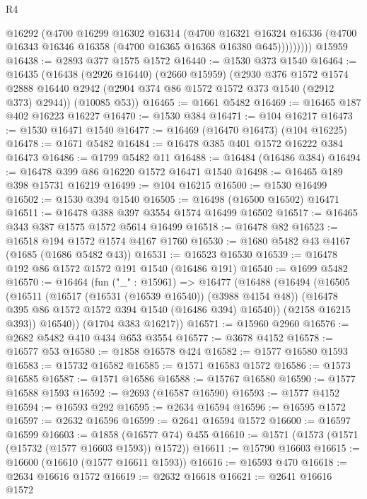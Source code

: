 \begin{lexlean}{R4}
\begin{coremodule}
              @16292
              (@4700
                @16299
                @16302
                @16314
                (@4700
                  @16321
                  @16324
                  @16336
                  (@4700 @16343 @16346 @16358 (@4700 @16365 @16368 @16380 @645)))))))))
    @15959
@16438 := @2893 @377 @1575 @1572
@16440 := @1530 @373 @1540
@16464 := @16435
    (@16438
      (@2926 @16440)
      (@2660 @15959)
      (@2930
        @376
        @1572
        @1574
        @2888
        @16440
        @2942
        (@2904 @374 @86 @1572 @1572 @373 @1540 (@2912 @373) @2944))
      (@10085 @53))
@16465 := @1661 @5482
@16469 := @16465 @187 @402 @16223 @16227
@16470 := @1530 @384
@16471 := @104 @16217
@16473 := @1530 @16471 @1540
@16477 := @16469 (@16470 @16473) (@104 @16225)
@16478 := @1671 @5482
@16484 := @16478 @385 @401 @1572 @16222 @384 @16473
@16486 := @1799 @5482 @11
@16488 := @16484 (@16486 @384)
@16494 := @16478 @399 @86 @16220 @1572 @16471 @1540
@16498 := @16465 @189 @398 @15731 @16219
@16499 := @104 @16215
@16500 := @1530 @16499
@16502 := @1530 @394 @1540
@16505 := @16498 (@16500 @16502) @16471
@16511 := @16478 @388 @397 @3554 @1574 @16499 @16502
@16517 := @16465 @343 @387 @1575 @1572 @5614 @16499
@16518 := @16478 @82
@16523 := @16518 @194 @1572 @1574 @4167 @1760
@16530 := @1680 @5482 @43 @4167 (@1685 (@1686 @5482 @43))
@16531 := @16523 @16530
@16539 := @16478 @192 @86 @1572 @1572 @191 @1540 (@16486 @191)
@16540 := @1699 @5482
@16570 := @16464
    (fun ("_" : @15961) =>
    @16477
      (@16488
        (@16494
          (@16505
            (@16511
              (@16517 (@16531 (@16539 @16540)) (@3988 @4154 @48))
              (@16478 @395 @86 @1572 @1572 @394 @1540 (@16486 @394) @16540))
            (@2158 @16215 @393))
          @16540))
      (@1704 @383 @16217))
@16571 := @15960 @2960
@16576 := @2682 @5482 @410 @434 @653 @3554
@16577 := @3678 @4152
@16578 := @16577 @53
@16580 := @1858 @16578 @424
@16582 := @1577 @16580 @1593
@16583 := @15732 @16582
@16585 := @1571 @16583 @1572
@16586 := @1573 @16585
@16587 := @1571 @16586
@16588 := @15767 @16580
@16590 := @1577 @16588 @1593
@16592 := @2693 (@16587 @16590)
@16593 := @1577 @4152
@16594 := @16593 @292
@16595 := @2634 @16594
@16596 := @16595 @1572
@16597 := @2632 @16596
@16599 := @2641 @16594 @1572
@16600 := @16597 @16599
@16603 := @1858 (@16577 @74) @455
@16610 := @1571 (@1573 (@1571 (@15732 (@1577 @16603 @1593)) @1572))
@16611 := @15790 @16603
@16615 := @16600 (@16610 (@1577 @16611 @1593))
@16616 := @16593 @470
@16618 := @2634 @16616 @1572
@16619 := @2632 @16618
@16621 := @2641 @16616 @1572

\end{coremodule}
\end{lexlean}
